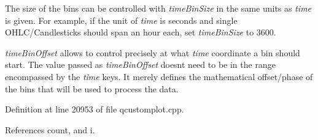 The size of the bins can be controlled with {\itshape time\+Bin\+Size} in the same units as {\itshape time} is given. For example, if the unit of {\itshape time} is seconds and single O\+H\+L\+C/\+Candlesticks should span an hour each, set {\itshape time\+Bin\+Size} to 3600.

{\itshape time\+Bin\+Offset} allows to control precisely at what {\itshape time} coordinate a bin should start. The value passed as {\itshape time\+Bin\+Offset} doesn\textquotesingle{}t need to be in the range encompassed by the {\itshape time} keys. It merely defines the mathematical offset/phase of the bins that will be used to process the data. 

Definition at line 20953 of file qcustomplot.\+cpp.



References count, and i.


